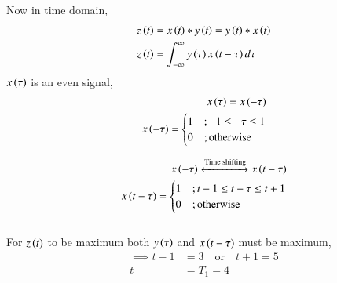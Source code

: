 \documentclass[a4,12pt,twocolumn]{IEEEtran}
\begin{document}
Now in time domain,
 \begin{align}
z\left(t\right) &=x\left(t\right)*y\left(t\right) = y\left(t\right)*x\left(t\right)\label{eq:gate_ee_Q31.7}\\
z\left(t\right) &=\int_{-\infty}^{\infty} y\left(\tau\right)x\left(t-\tau\right)d\tau\label{eq:gate_ee_Q31.8}
\end{align}
$x\left(\tau\right)$ is an even signal,
\begin{align}
x\left(\tau\right)= x\left(-\tau\right)\label{eq:gate_ee_Q31.9}\\
 x\left(-\tau\right)= 
    \begin{cases}
        1 & ; -1\leq -\tau \leq 1 \\
        0 & ; \text{otherwise} \\
    \end{cases}\label{eq:gate_ee_Q31.10}
    \end{align}
    
    \begin{align}
    x\left(-\tau\right) \xleftrightarrow{\text{Time shifting}} x\left(t-\tau\right)\label{eq:gate_ee_Q31.11} \\
    x\left(t-\tau\right)= 
    \begin{cases}
        1 & ; t-1\leq t-\tau \leq t+1 \\
        0 & ; \text{otherwise} \\
    \end{cases}\label{eq:gate_ee_Q31.12}
\end{align}\\
For $z\left(t\right)$ to be maximum both $y\left(\tau\right)$ and $x\left(t-\tau\right)$ must be maximum,
\begin{align}
\implies t-1 &= 3 \quad \text{or} \quad t+1 = 5 \nonumber \\
t &= T_1 = 4 \nonumber
\end{align}
\end{document}
